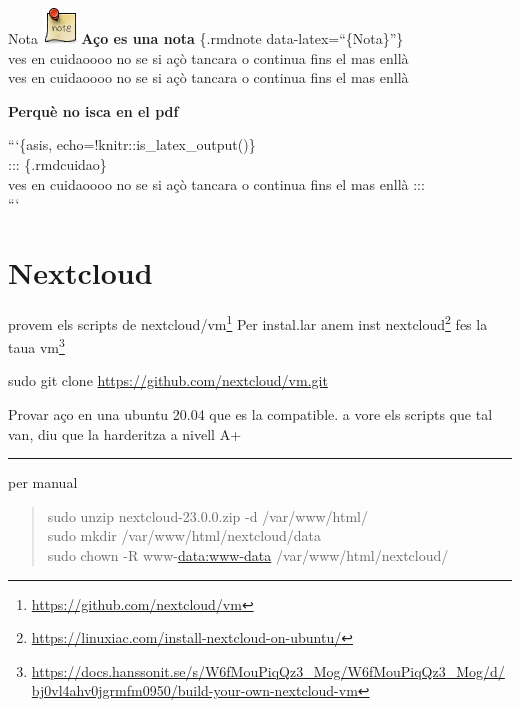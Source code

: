 \documentclass[
  10pt,
]{krantz}
\DeclareRobustCommand{\href}[2]{#2\footnote{\url{#1}}}
\begin{document}
\begin{rmdnote}{Nota}
\includegraphics{imatges/note.png} \textbf{Aço es una nota} \{.rmdnote data-latex=``\{Nota\}''\}\\
ves en cuidaoooo no se si açò tancara o continua fins el mas enllà\\
ves en cuidaoooo no se si açò tancara o continua fins el mas enllà

\end{rmdnote}

\begin{rmdinfo}{}
\textbf{Perquè no isca en el pdf}

```\{asis, echo=!knitr::is\_latex\_output()\}\\
::: \{.rmdcuidao\}\\
ves en cuidaoooo no se si açò tancara o continua fins el mas enllà :::\\
```

\end{rmdinfo}

\hypertarget{nextcloud}{%
\chapter{Nextcloud}\label{nextcloud}}

provem els scripts de \href{https://github.com/nextcloud/vm}{nextcloud/vm} Per instal.lar anem \href{https://linuxiac.com/install-nextcloud-on-ubuntu/}{inst nextcloud} fes la taua \href{https://docs.hanssonit.se/s/W6fMouPiqQz3_Mog/W6fMouPiqQz3_Mog/d/bj0vl4ahv0jgrmfm0950/build-your-own-nextcloud-vm}{vm}

sudo git clone \url{https://github.com/nextcloud/vm.git}

Provar aço en una ubuntu 20.04 que es la compatible. a vore els scripts que tal van, diu que la harderitza a nivell A+

\begin{center}\rule{0.5\linewidth}{0.5pt}\end{center}

per manual

\begin{quote}
sudo unzip nextcloud-23.0.0.zip -d /var/www/html/\\
sudo mkdir /var/www/html/nextcloud/data\\
sudo chown -R www-\url{data:www-data} /var/www/html/nextcloud/
\end{quote}
\end{document}
